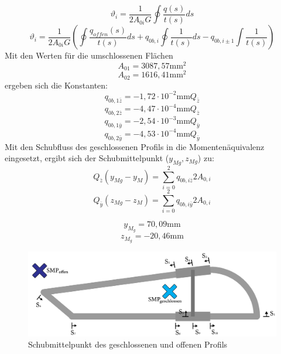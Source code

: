 \begin{equation}
	\vartheta_{i} = \frac{1}{2A_{0i}G}\oint\frac{q(s)}{t(s)}ds
\end{equation}
\begin{equation}
	\vartheta_{i} = \frac{1}{2A_{0i}G}(\oint\frac{q_{offen}(s)}{t(s)}ds+q_{0b,i}\oint\frac{1}{t(s)}ds-q_{0b,i\pm1}\int\frac{1}{t(s)})
\end{equation}
Mit den Werten für die umschlossenen Flächen
$$
	A_{01}=3087,57\mathrm{mm}^2
$$
$$
	A_{02}=1616,41\mathrm{mm}^2
$$
ergeben sich die Konstanten:
$$
	q_{0b,1\bar{z}}=-1,72\cdot10^{-2}\mathrm{mm}Q_{\bar{z}}
$$$$
	q_{0b,2\bar{z}}=-4,47\cdot10^{-4}\mathrm{mm}Q_{\bar{z}}
$$$$
	q_{0b,1\bar{y}}=-2,54\cdot10^{-3}\mathrm{mm}Q_{\bar{y}}
$$$$
	q_{0b,2\bar{y}}=-4,53\cdot10^{-4}\mathrm{mm}Q_{\bar{y}}
$$
Mit den Schubfluss des geschlossenen Profils in die Momentenäquivalenz eingesetzt, ergibt sich der Schubmittelpunkt ($y_{Mg}, z_{Mg}$) zu:
\begin{equation}
	Q_{\bar{z}}(y_{Mg}-y_{M})=\sum_{i=0}^{2}q_{0b,i\bar{z}}2A_{0,i}
\end{equation}
\begin{equation}
Q_{\bar{y}}(z_{Mg}-z_{M})=\sum_{i=0}^{2}q_{0b,i\bar{y}}2A_{0,i}
\end{equation}

$$
	y_{M_{g}}=70,09\mathrm{mm}
$$
$$
	z_{M_{g}}=-20,46\mathrm{mm}
$$
\begin{figure}[h]
	\centering
	\includegraphics[width=1\textwidth]{Bilder/SMP}
	\caption{Schubmittelpunkt des geschlossenen und offenen Profils}
\end{figure}
